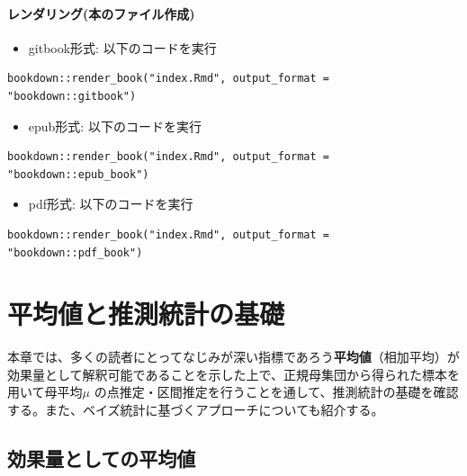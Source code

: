 \documentclass[
  ja=standard, xelatex, base=12pt]{bxjsreport}
\providecommand{\tightlist}{%
  \setlength{\itemsep}{0pt}\setlength{\parskip}{0pt}}
\begin{document}
\hypertarget{ux30ecux30f3ux30c0ux30eaux30f3ux30b0ux672cux306eux30d5ux30a1ux30a4ux30ebux4f5cux6210}{%
\subsubsection{レンダリング(本のファイル作成)}\label{ux30ecux30f3ux30c0ux30eaux30f3ux30b0ux672cux306eux30d5ux30a1ux30a4ux30ebux4f5cux6210}}

\begin{itemize}
\tightlist
\item
  gitbook形式: 以下のコードを実行
\end{itemize}

\begin{verbatim}
bookdown::render_book("index.Rmd", output_format = "bookdown::gitbook")
\end{verbatim}

\begin{itemize}
\tightlist
\item
  epub形式: 以下のコードを実行
\end{itemize}

\begin{verbatim}
bookdown::render_book("index.Rmd", output_format = "bookdown::epub_book")
\end{verbatim}

\begin{itemize}
\tightlist
\item
  pdf形式: 以下のコードを実行
\end{itemize}

\begin{verbatim}
bookdown::render_book("index.Rmd", output_format = "bookdown::pdf_book")
\end{verbatim}

\hypertarget{ux5e73ux5747ux5024ux3068ux63a8ux6e2cux7d71ux8a08ux306eux57faux790e}{%
\chapter{平均値と推測統計の基礎}\label{ux5e73ux5747ux5024ux3068ux63a8ux6e2cux7d71ux8a08ux306eux57faux790e}}

本章では、多くの読者にとってなじみが深い指標であろう\textbf{平均値}（相加平均）が効果量として解釈可能であることを示した上で、正規母集団から得られた標本を用いて母平均\(\mu\) の点推定・区間推定を行うことを通して、推測統計の基礎を確認する。また、ベイズ統計に基づくアプローチについても紹介する。

\hypertarget{ux52b9ux679cux91cfux3068ux3057ux3066ux306eux5e73ux5747ux5024}{%
\section{効果量としての平均値}\label{ux52b9ux679cux91cfux3068ux3057ux3066ux306eux5e73ux5747ux5024}}
\end{document}
